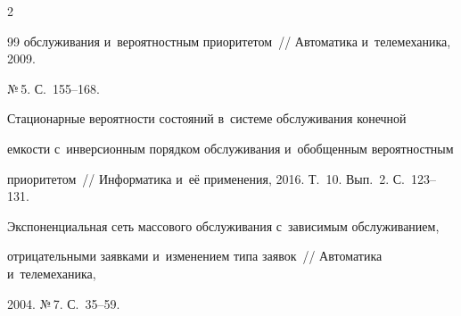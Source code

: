 \begin{multicols}{2}
{{\begin{thebibliography}{99}
обслуживания и~вероятностным приоритетом~// Автоматика и~телемеханика, 2009. 


№\,5. С.~155--168.


















Стационарные вероятности состояний в~системе обслуживания конечной 


емкости с~инверсионным порядком обслуживания и~обобщенным вероятностным 


приоритетом~// Информатика и~её применения, 2016. Т.~10. Вып.~2. С.~123--131.





















Экспоненциальная сеть массового обслуживания с~зависимым обслуживанием, 


отрицательными заявками и~изменением типа заявок~// Автоматика и~телемеханика, 


2004. №\,7. С.~35--59.












\end{thebibliography}}}
\end{multicols}
